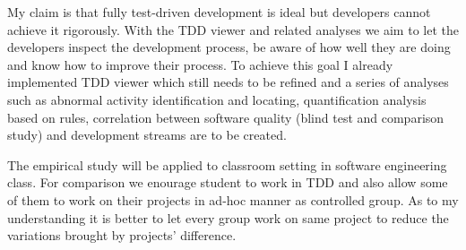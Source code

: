 \documentclass[11pt,twocolumn]{article}
\begin{document}
\label{sec:method} 
My claim is that fully test-driven development is ideal but developers
cannot achieve it rigorously. With the TDD viewer and related analyses we
aim to let the developers inspect the development process, be aware of how
well they are doing and know how to improve their process. To achieve this
goal I already implemented TDD viewer which still needs to be refined and a
series of analyses such as abnormal activity identification and locating,
quantification analysis based on rules, correlation between software
quality (blind test and comparison study) and development streams are to be
created.

The empirical study will be applied to classroom setting in software
engineering class. For comparison we enourage student to work in
TDD and also allow some of them to work on their projects in ad-hoc
manner as controlled group. As to my understanding it is better to let
every group work on same project to reduce the variations brought by
projects' difference.



\end{document}

